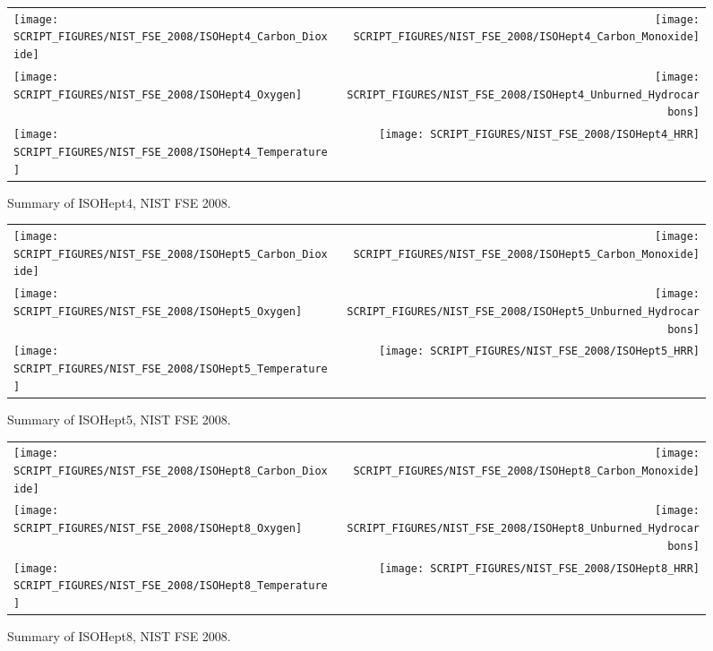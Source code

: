 \begin{figure}[p]
\begin{tabular*}{\textwidth}{l@{\extracolsep{\fill}}r}
\texttt{[image: SCRIPT\_FIGURES/NIST\_FSE\_2008/ISOHept4\_Carbon\_Dioxide]} &
\texttt{[image: SCRIPT\_FIGURES/NIST\_FSE\_2008/ISOHept4\_Carbon\_Monoxide]} \\
\texttt{[image: SCRIPT\_FIGURES/NIST\_FSE\_2008/ISOHept4\_Oxygen]} &
\texttt{[image: SCRIPT\_FIGURES/NIST\_FSE\_2008/ISOHept4\_Unburned\_Hydrocarbons]} \\
\texttt{[image: SCRIPT\_FIGURES/NIST\_FSE\_2008/ISOHept4\_Temperature]} &
\texttt{[image: SCRIPT\_FIGURES/NIST\_FSE\_2008/ISOHept4\_HRR]}
\end{tabular*}
\caption[Summary of ISOHept4, NIST FSE 2008]{Summary of ISOHept4, NIST FSE 2008.}
\label{NIST_FSE_1994_ISOHept4}
\end{figure}

\begin{figure}[p]
\begin{tabular*}{\textwidth}{l@{\extracolsep{\fill}}r}
\texttt{[image: SCRIPT\_FIGURES/NIST\_FSE\_2008/ISOHept5\_Carbon\_Dioxide]} &
\texttt{[image: SCRIPT\_FIGURES/NIST\_FSE\_2008/ISOHept5\_Carbon\_Monoxide]} \\
\texttt{[image: SCRIPT\_FIGURES/NIST\_FSE\_2008/ISOHept5\_Oxygen]} &
\texttt{[image: SCRIPT\_FIGURES/NIST\_FSE\_2008/ISOHept5\_Unburned\_Hydrocarbons]} \\
\texttt{[image: SCRIPT\_FIGURES/NIST\_FSE\_2008/ISOHept5\_Temperature]} &
\texttt{[image: SCRIPT\_FIGURES/NIST\_FSE\_2008/ISOHept5\_HRR]}
\end{tabular*}
\caption[Summary of ISOHept5, NIST FSE 2008]{Summary of ISOHept5, NIST FSE 2008.}
\label{NIST_FSE_1994_ISOHept5}
\end{figure}

\begin{figure}[p]
\begin{tabular*}{\textwidth}{l@{\extracolsep{\fill}}r}
\texttt{[image: SCRIPT\_FIGURES/NIST\_FSE\_2008/ISOHept8\_Carbon\_Dioxide]} &
\texttt{[image: SCRIPT\_FIGURES/NIST\_FSE\_2008/ISOHept8\_Carbon\_Monoxide]} \\
\texttt{[image: SCRIPT\_FIGURES/NIST\_FSE\_2008/ISOHept8\_Oxygen]} &
\texttt{[image: SCRIPT\_FIGURES/NIST\_FSE\_2008/ISOHept8\_Unburned\_Hydrocarbons]} \\
\texttt{[image: SCRIPT\_FIGURES/NIST\_FSE\_2008/ISOHept8\_Temperature]} &
\texttt{[image: SCRIPT\_FIGURES/NIST\_FSE\_2008/ISOHept8\_HRR]}
\end{tabular*}
\caption[Summary of ISOHept8, NIST FSE 2008]{Summary of ISOHept8, NIST FSE 2008.}
\label{NIST_FSE_1994_ISOHept8}
\end{figure}

